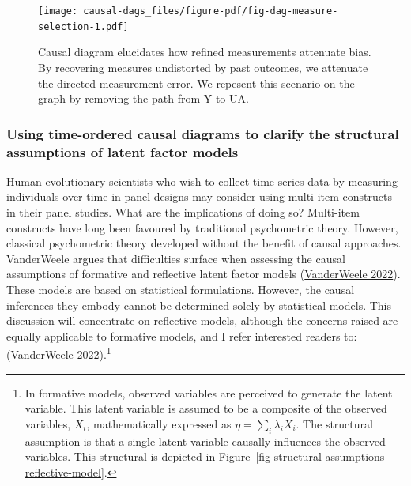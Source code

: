 \documentclass[
  singlecolumn]{article}
\begin{document}
\begin{figure}

{\centering \texttt{[image: causal-dags\_files/figure-pdf/fig-dag-measure-selection-1.pdf]}

}

\caption{\label{fig-dag-measure-selection}Causal diagram elucidates how
refined measurements attenuate bias. By recovering measures undistorted
by past outcomes, we attenuate the directed measurement error. We
repesent this scenario on the graph by removing the path from Y to UA.}

\end{figure}

\hypertarget{using-time-ordered-causal-diagrams-to-clarify-the-structural-assumptions-of-latent-factor-models}{%
\subsubsection{Using time-ordered causal diagrams to clarify the
structural assumptions of latent factor
models}\label{using-time-ordered-causal-diagrams-to-clarify-the-structural-assumptions-of-latent-factor-models}}

Human evolutionary scientists who wish to collect time-series data by
measuring individuals over time in panel designs may consider using
multi-item constructs in their panel studies. What are the implications
of doing so? Multi-item constructs have long been favoured by
traditional psychometric theory. However, classical psychometric theory
developed without the benefit of causal approaches. VanderWeele argues
that difficulties surface when assessing the causal assumptions of
formative and reflective latent factor models
(\protect\hyperlink{ref-vanderweele2022}{VanderWeele 2022}). These
models are based on statistical formulations. However, the causal
inferences they embody cannot be determined solely by statistical
models. This discussion will concentrate on reflective models, although
the concerns raised are equally applicable to formative models, and I
refer interested readers to:
(\protect\hyperlink{ref-vanderweele2022}{VanderWeele 2022}).\footnote{In
  formative models, observed variables are perceived to generate the
  latent variable. This latent variable is assumed to be a composite of
  the observed variables, \(X_i\), mathematically expressed as
  \(\eta = \sum_i\lambda_i X_i\). The structural assumption is that a
  single latent variable causally influences the observed variables.
  This structural is depicted in
  Figure~\ref{fig-structural-assumptions-reflective-model}.}
\end{document}

